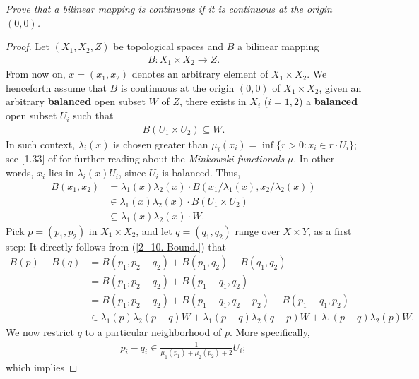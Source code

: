 \textit{%
Prove that a bilinear mapping is continuous %
if it is continuous at the origin $(0, 0)$.
}
\begin{proof}
Let $(X_1, X_2, Z)$ be topological spaces %
and $B$ a bilinear mapping %
%
\begin{align}
  B: X_1 \times X_2 \to Z. 
\end{align}
%
From now on, $x=(x_1, x_2)$ denotes an arbitrary element of %
%
  $X_1\times X_2$. %
%
We henceforth assume that $B$ is continuous at the origin %
%
  $(0, 0)$ of $X_1\times X_2$, \ie  %
%
given an arbitrary \textbf{balanced} open subset $W$ of $Z$, %
there exists in $X_i$ ($i=1, 2$) a \textbf{balanced} open subset $U_i$ %
such that %
%
\begin{align}
  B(U_1 \times U_2) \subseteq W .
\end{align}
%
In such context, %
%
  $\lambda_i(x) $ is chosen greater than %
  $\mu_i(x_i)=\inf\{r > 0: x_i \in r \cdot U_i\}$; %
%
see [1.33] of \cite{FA} for further reading about the %
\textit{Minkowski functionals} $\mu$. %
%
In other words, $x_i$ lies in $\lambda_i(x) U_i$, since $U_i$ is balanced. %
%
Thus, %
%
\begin{align}
  B(x_1, x_2) 
    & = 
      \lambda_1(x)\lambda_2(x) \cdot B(
        x_1/ \lambda_1(x), 
        x_2/ \lambda_2(x)) \\
    & \in 
  \lambda_1(x) \lambda_2(x) \cdot B(U_1 \times U_2) \\
    & \subseteq 
  \lambda_1(x) \lambda_2(x) \cdot W. \label{2_10. Bound.}
\end{align}
%
Pick $p=(p_1, p_2)$ in $X_1\times X_2$,  %
and let $ q=(q_1, q_2)$ range over $X \times Y$, as a first step: %
It directly follows from (\ref{2_10. Bound.}) that %
%
\begin{align}
  B(p) - B(q) &= B(p_1, p_2 - q_2) + B(p_1, q_2) - B(q_1, q_2)\\
  &= B(p_1, p_2 - q_2) + B(p_1-q_1, q_2)  \\
  &= B(p_1, p_2 - q_2) + B(p_1 -q_1, q_2 -p_2) + B(p_1-q_1,p_2) \\
  &\in  
     \lambda_1(p)   \lambda_2(p-q) W + 
     \lambda_1(p-q) \lambda_2(q-p) W + 
     \lambda_1(p-q) \lambda_2(p)   W.\label{2.10. In multiple of W.}
\end{align}
%
We now restrict $q$ to a particular neighborhood of $p$. %
More specifically, 
%
\begin{align}
  p_i - q_i \in \frac{1}{\mu_1(p_1) + \mu_2(p_2) + 2} U_i; 
\end{align}
%
which implies %

\end{proof}
